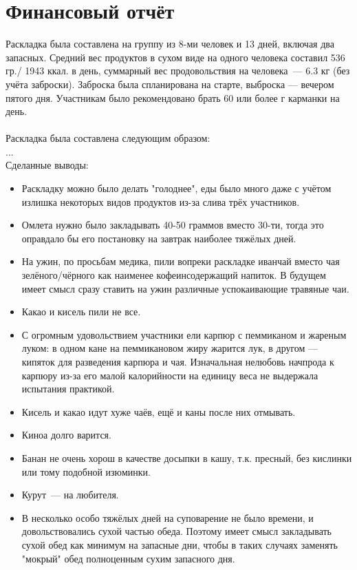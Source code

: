 \section{Финансовый отчёт}

Раскладка была составлена на группу из 8-ми человек и 13 дней, включая два запасных. Средний вес 
продуктов в сухом виде на одного человека составил 536 гр./ 1943 ккал. в день, суммарный вес продовольствия на человека~--- 6.3 кг (без учёта заброски).
Заброска была спланирована на старте, выброска — вечером пятого дня. Участникам было рекомендовано брать 60 или более г карманки на день.
\\\\
Раскладка была составлена следующим образом:\\
...\\
Сделанные выводы:
\begin{itemize}
    \item Раскладку можно было делать "голоднее", еды было много даже с учётом излишка некоторых видов продуктов из-за слива трёх участников.
    \item Омлета нужно было закладывать 40-50 граммов вместо 30-ти, тогда это оправдало бы его постановку на завтрак наиболее тяжёлых дней.
    \item На ужин, по просьбам медика, пили вопреки раскладке иванчай вместо чая зелёного/чёрного как наименее кофеинсодержащий напиток. В будущем 
имеет смысл сразу ставить на ужин различные успокаивающие травяные чаи.
    \item Какао и кисель пили не все.
    \item С огромным удовольствием участники ели карпюр с пеммиканом и жареным луком: в одном кане на пеммикановом жиру жарится лук, в другом — 
кипяток для разведения карпюра и чая. Изначальная нелюбовь начпрода к карпюру из-за его малой калорийности на единицу веса не выдержала испытания 
практикой.
    \item Кисель и какао идут хуже чаёв, ещё и каны после них отмывать.
    \item Киноа долго варится.
    \item Банан не очень хорош в качестве досыпки в кашу, т.к. пресный, без кислинки или тому подобной изюминки.
    \item Курут~---  на любителя.
    \item В несколько особо тяжёлых дней на суповарение не было времени, и 
довольствовались сухой частью обеда. Поэтому имеет смысл закладывать сухой обед как минимум на запасные дни, чтобы в таких случаях заменять "мокрый"
обед полноценным сухим запасного дня.
    
\end{itemize}


